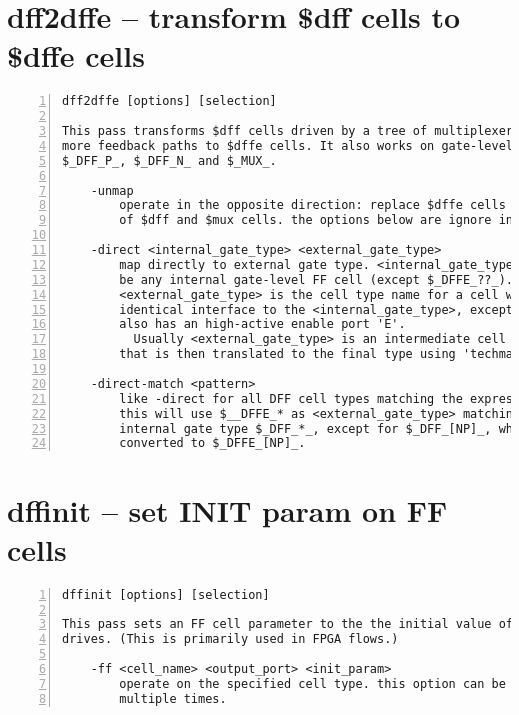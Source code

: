 \section{dff2dffe -- transform \$dff cells to \$dffe cells}
\label{cmd:dff2dffe}
\begin{lstlisting}[numbers=left,frame=single]
    dff2dffe [options] [selection]

This pass transforms $dff cells driven by a tree of multiplexers with one or
more feedback paths to $dffe cells. It also works on gate-level cells such as
$_DFF_P_, $_DFF_N_ and $_MUX_.

    -unmap
        operate in the opposite direction: replace $dffe cells with combinations
        of $dff and $mux cells. the options below are ignore in unmap mode.

    -direct <internal_gate_type> <external_gate_type>
        map directly to external gate type. <internal_gate_type> can
        be any internal gate-level FF cell (except $_DFFE_??_). the
        <external_gate_type> is the cell type name for a cell with an
        identical interface to the <internal_gate_type>, except it
        also has an high-active enable port 'E'.
          Usually <external_gate_type> is an intermediate cell type
        that is then translated to the final type using 'techmap'.

    -direct-match <pattern>
        like -direct for all DFF cell types matching the expression.
        this will use $__DFFE_* as <external_gate_type> matching the
        internal gate type $_DFF_*_, except for $_DFF_[NP]_, which is
        converted to $_DFFE_[NP]_.
\end{lstlisting}

\section{dffinit -- set INIT param on FF cells}
\label{cmd:dffinit}
\begin{lstlisting}[numbers=left,frame=single]
    dffinit [options] [selection]

This pass sets an FF cell parameter to the the initial value of the net it
drives. (This is primarily used in FPGA flows.)

    -ff <cell_name> <output_port> <init_param>
        operate on the specified cell type. this option can be used
        multiple times.
\end{lstlisting}

